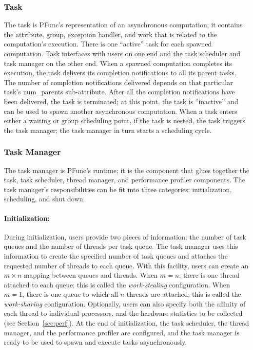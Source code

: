 \subsubsection{Task}
\label{subsubsec:task}
%
The task is PFunc's representation of an asynchronous computation; it contains
the attribute, group, exception handler, and work that is related to the
computation's execution.
%
There is one ``active'' task for each spawned computation.
%
Task interfaces with users on one end and the task scheduler and task manager
on the other end.
%
When a spawned computation completes its execution, the task delivers its
completion notifications to all its parent tasks.
%
The number of completion notifications delivered depends on that particular
task's num\_parents sub-attribute.
%
After all the completion notifications have been delivered, the task is 
terminated; at this point, the task is ``inactive'' and can be used to spawn 
another asynchronous computation.
%
When a task enters either a waiting or group scheduling point, if the task is 
nested, the task triggers the task manager; the task manager in turn starts a
scheduling cycle.
%

\subsubsection{Task Manager}
\label{subsubsec:task_manager}

The task manager is PFunc's runtime; it is the component that glues together
the task, task scheduler, thread manager, and performance profiler components.
%
The task manager's responsibilities can be fit into three categories:
initialization, scheduling, and shut down.
 
\paragraph{Initialization:} During initialization, users provide two pieces of
information: the number of task queues and the number of threads per task
queue.
%
The task manager uses this information to create the specified number of task 
queues and attaches the requested number of threads to each queue. 
%
With this facility, users can create an $m\times{}n$ mapping between queues and
threads.
%
When $m=n$, there is one thread attached to each queue; this is called the 
\emph{work-stealing} configuration.
%
When $m=1$, there is one queue to which all $n$ threads are attached; this is
called the \emph{work-sharing} configuration.
%
Optionally, users can also specify both the affinity of each thread to
individual processors, and the hardware statistics to be collected (see
Section~\ref{sec:perf}).
%
At the end of initialization, the task scheduler, the thread manager, and
the performance profiler are configured, and the task manager is ready to be
used to spawn and execute tasks asynchronously.

